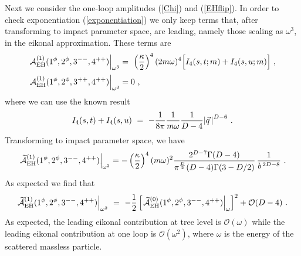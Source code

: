 \documentclass[a4paper,11pt]{article}
\numberwithin{equation}{section}
\begin{document}
%
Next we consider the one-loop amplitudes (\ref{Chi}) and (\ref{EHflip}). In order to check exponentiation (\ref{exponentiation}) we only keep terms that, after transforming to impact parameter space, are leading, namely those scaling as $\omega^3$, in the eikonal approximation. These terms are
\begin{equation}
    \begin{split}
        \left. \mathcal{A}_{\rm EH}^{(1)} (1^\phi, 2^\phi, 3^{--}, 4^{++}) \right|_{\omega^3}& = \  \left(\frac{\kappa}{2}\right)^4 (2 m \omega)^4 \Big[ I_4(s, t; m) + I_4 (s, u; m)\Big] \ , \\[.2em]
        \left. \mathcal{A}_{\rm EH}^{(1)} (1^\phi, 2^\phi, 3^{++}, 4^{++})\right|_{\omega^3}&  
        = 0 \ ,
    \end{split}
\end{equation}
where we can use the known result
\begin{equation}
    \label{boxcomb}
    I_4(s, t) + I_4 (s, u) \ = \ - {\frac{1}{8\pi}} {\frac{1}{m\omega}} {1\over D-4} {\abs{\vec{q}\,}^{D-6} }\ .
\end{equation}
Transforming to impact parameter space, we have 
\begin{align}
\left.\widetilde{\mathcal{A}}_{\rm EH}^{(1)} (1^\phi, 2^\phi, 3^{--}, 4^{++})\right|_{\omega^2}
= -\left({\kappa\over 2} \right)^4 {(m \omega)^2} \frac{2^{D-7} \Gamma ( D-4)}{\pi^{\frac{D}{2}} (D-4) \Gamma (3 - D/2)} \, {1\over b^{\, 2D-8}} \ . 
\end{align} 
As expected we find that 
\begin{align} 
\left.\widetilde{\mathcal{A}}_{\rm EH}^{(1)} (1^\phi, 2^\phi, 3^{--}, 4^{++})\right|_{\omega^2} \ = \ - \frac{1}{2}\left[\left.\widetilde{\mathcal{A}}_{\rm EH}^{(0)} (1^\phi, 2^\phi, 3^{--}, 4^{++})\right|_{\omega}\right]^2 + \mathcal{O} (D-4)
\ . 
\end{align}
As expected, the  leading eikonal contribution  at tree level is $\mathcal{O}(\omega)$ while the leading eikonal contribution at one loop is  $\mathcal{O}(\omega^2)$, where $\omega$ is the energy of the scattered massless particle.
\end{document}
